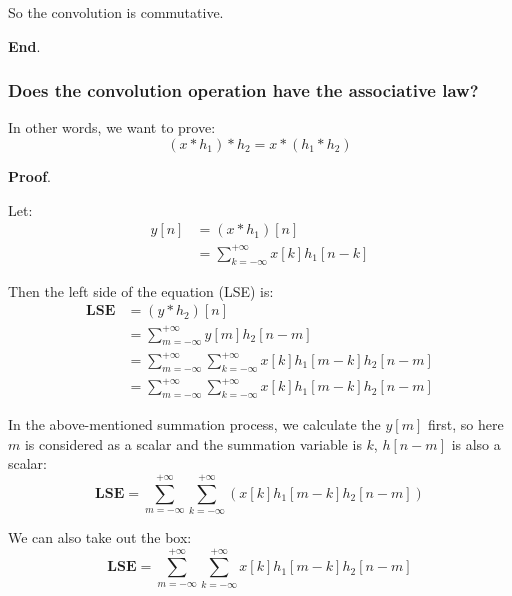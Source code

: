     So the convolution is commutative.

    \noindent \textbf{End}.

    \subsubsection{Does the convolution operation have the associative law?}
    In other words, we want to prove:
        \begin{equation}
            (x \ast h_1) \ast h_2 = x \ast(h_1 \ast h_2) 
        \end{equation}

    \noindent \textbf{Proof}.

    Let:
        \begin{equation}
            \begin{aligned}
                y[n] &= (x\ast h_1)[n]\\
                     &= \sum_{k=-\infty}^{+\infty} x[k]h_1[n-k]
            \end{aligned}
        \end{equation}
    
    Then the left side of the equation (LSE) is:
        \begin{equation}
            \begin{aligned}
        \mathbf{LSE} &= (y \ast h_2)[n]\\
                     &= \sum_{m=-\infty}^{+\infty} \boxed{y[m]}h_2[n-m] \\
                     &= \sum_{m=-\infty}^{+\infty} \boxed{\sum_{k=-\infty}^{+\infty} x[k]h_1[m-k]} h_2[n-m] \\
                     &= \sum_{m=-\infty}^{+\infty} \sum_{k=-\infty}^{+\infty} x[k]h_1[m-k] h_2[n-m]
            \end{aligned}
        \end{equation}
    
    In the above-mentioned summation process, we calculate the $y[m]$ first, 
    so here $m$ is considered as a scalar and the summation variable is $k$, $h[n-m]$ is also a scalar:
        \begin{equation}
            \mathbf{LSE} =\sum_{m=-\infty}^{+\infty} \boxed{\sum_{k=-\infty}^{+\infty} (x[k]h_1[m-k] h_2[n-m])}
        \end{equation}
    
    We can also take out the box:
        \begin{equation}
            \mathbf{LSE} =\sum_{m=-\infty}^{+\infty} \sum_{k=-\infty}^{+\infty} x[k]h_1[m-k] h_2[n-m]
        \end{equation}
    
